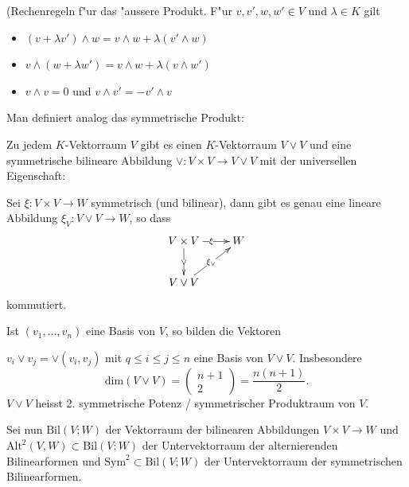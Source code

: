\documentclass[11pt, a4paper]{article}
\begin{document}
\begin{remark}(Rechenregeln f"ur das "aussere Produkt.
F"ur $v, v', w, w' \in V$ und $\lambda \in K$ gilt
\begin{itemize}
\item $(v + \lambda v') \wedge w = v  \wedge w + \lambda(v'  \wedge w )$
\item $v  \wedge (w + \lambda w') = v  \wedge w + \lambda(v  \wedge w ')$
\item $v \wedge v = 0$ und $ v \wedge v' = - v' \wedge v$
\end{itemize}
\end{remark}

\begin{theorem}
Man definiert analog das symmetrische Produkt:

Zu jedem $K$-Vektorraum $V$ gibt es einen $K$-Vektorraum $V \vee V$ und eine symmetrische bilineare Abbildung $\vee: V \times V \rightarrow V \vee V$ mit der universellen Eigenschaft:

Sei $\xi : V \times V \rightarrow W$ symmetrisch (und bilinear), dann gibt es genau eine lineare Abbildung $\xi_V: V \vee V \rightarrow W$, so dass
\begin{gather*}
  \xymatrix{V \times V  \ar[d]|{\vee} \ar[r]|{\xi} & W\\
    V \vee V \ar[ur]|{\xi_\vee} & }
\end{gather*}
kommutiert.

Ist $(v_1, ..., v_n)$ eine Basis von $V$, so bilden die Vektoren

$v_i \vee v_j = \vee (v_i, v_j)$ mit $q \leq i \leq j \leq n$ eine Basis von $V \vee V$. Insbesondere
$$
\mathrm{dim}(V \vee V) = \left(\begin{array}{c} n+1\\ 2 
\end{array} \right) = \frac{n(n+1)}{2}.
$$
$V \vee V$ heisst 2. symmetrische Potenz / symmetrischer Produktraum von $V$.
\end{theorem}

Sei nun $\mathrm{Bil}(V; W)$ der Vektorraum der bilinearen Abbildungen $V \times V \rightarrow W$ und $\mathrm{Alt}^2(V, W) \subset \mathrm{Bil}(V; W)$ der Untervektorraum der alternierenden Bilinearformen und $\mathrm{Sym}^2 \subset \mathrm{Bil}(V; W)$ der Untervektorraum der symmetrischen Bilinearformen.
\end{document}
